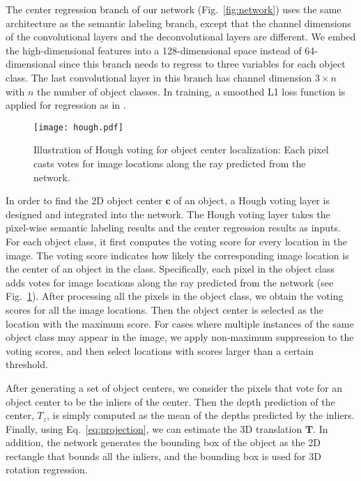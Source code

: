 \documentclass[conference]{IEEEtran}
\begin{document}
The center regression branch of our network (Fig.~\ref{fig:network}) uses the same architecture as the semantic labeling branch, except that the channel dimensions of the convolutional layers and the deconvolutional layers are different. We embed the high-dimensional features into a 128-dimensional space instead of 64-dimensional since this branch needs to regress to three variables for each object class. The last convolutional layer in this branch has channel dimension $3 \times n$ with $n$ the number of object classes. In training, a smoothed L1 loss function is applied for regression as in \cite{girshick2015fast}.

\begin{figure}
	\centering
	\texttt{[image: hough.pdf]}
	\caption{Illustration of Hough voting for object center localization: Each pixel casts votes for image locations along the ray predicted from the network.}
	\vspace{-4mm}
	\label{fig:hough}
\end{figure}


In order to find the 2D object center $\mathbf{c}$ of an object, a Hough voting layer is designed and integrated into the network. The Hough voting layer takes the pixel-wise semantic labeling results and the center regression results as inputs. For each object class, it first computes the voting score for every location in the image. The voting score indicates how likely the corresponding image location is the center of an object in the class. Specifically, each pixel in the object class adds votes for image locations along the ray predicted from the network (see Fig.~\ref{fig:hough}). After processing all the pixels in the object class, we obtain the voting scores for all the image locations. Then the object center is selected as the location with the maximum score. For cases where multiple instances of the same object class may appear in the image, we apply non-maximum suppression to the voting scores, and then select locations with scores larger than a certain threshold.

After generating a set of object centers, we consider the pixels that vote for an object center to be the inliers of the center. Then the depth prediction of the center, $T_z$, is simply computed as the mean of the depths predicted by the inliers. Finally, using Eq.~\ref{eq:projection}, we can estimate the 3D translation $\mathbf{T}$. In addition, the network generates the bounding box of the object as the 2D rectangle that bounds all the inliers, and the bounding box is used for 3D rotation regression.
\end{document}
